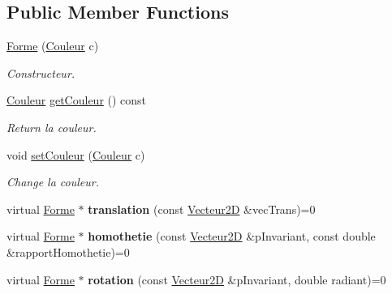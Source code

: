 \subsection*{Public Member Functions}
\begin{DoxyCompactItemize}
\item 
\mbox{\hyperlink{class_forme_a009ca469830cd3e0c622c2bd446d374b}{Forme}} (\mbox{\hyperlink{class_couleur}{Couleur}} c)
\begin{DoxyCompactList}\small\item\em Constructeur. \end{DoxyCompactList}\item 
\mbox{\label{class_forme_a4fb5ac9b55ecb4af4ceeb05aeb618873}} 
\mbox{\hyperlink{class_couleur}{Couleur}} \mbox{\hyperlink{class_forme_a4fb5ac9b55ecb4af4ceeb05aeb618873}{get\+Couleur}} () const
\begin{DoxyCompactList}\small\item\em Return la couleur. \end{DoxyCompactList}\item 
\mbox{\label{class_forme_a4ac59817d48d339134957a35f5b5cff9}} 
void \mbox{\hyperlink{class_forme_a4ac59817d48d339134957a35f5b5cff9}{set\+Couleur}} (\mbox{\hyperlink{class_couleur}{Couleur}} c)
\begin{DoxyCompactList}\small\item\em Change la couleur. \end{DoxyCompactList}\item 
\mbox{\label{class_forme_a0cd165ab7f0cf8b3411780ac7455b2e6}} 
virtual \mbox{\hyperlink{class_forme}{Forme}} $\ast$ {\bfseries translation} (const \mbox{\hyperlink{class_vecteur2_d}{Vecteur2D}} \&vec\+Trans)=0
\item 
\mbox{\label{class_forme_a657b8eb12905a4a12af0aa00508afcc1}} 
virtual \mbox{\hyperlink{class_forme}{Forme}} $\ast$ {\bfseries homothetie} (const \mbox{\hyperlink{class_vecteur2_d}{Vecteur2D}} \&p\+Invariant, const double \&rapport\+Homothetie)=0
\item 
\mbox{\label{class_forme_ae8b1eacae70974e1ca8fb048652b9306}} 
virtual \mbox{\hyperlink{class_forme}{Forme}} $\ast$ {\bfseries rotation} (const \mbox{\hyperlink{class_vecteur2_d}{Vecteur2D}} \&p\+Invariant, double radiant)=0

\end{DoxyCompactItemize}
